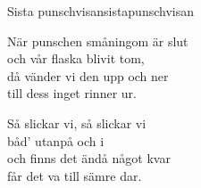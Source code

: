 \begin{song}{Sista punschvisan}{sistapunschvisan}
\begin{vers}
När punschen småningom är slut\\
och vår flaska blivit tom,\\
då vänder vi den upp och ner\\
till dess inget rinner ur.\\
\end{vers}
\begin{vers}
\repopen Så slickar vi, så slickar vi\\
båd' utanpå och i\\
och finns det ändå något kvar\\
får det va till sämre dar. \repclose\\
\end{vers}
\end{song}
